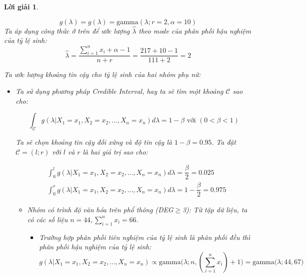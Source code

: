 \documentclass[14pt, a4paper]{article}
\theoremstyle{sltheorem}
\theoremstyle{soltheorem}
\newtheorem*{loigiai}{Lời giải}
\begin{document}
\begin{loigiai}
\begin{enumerate}
\begin{itemize}
\begin{itemize}
\begin{equation*}
                    g(\lambda) = g(\lambda) = \text{gamma}(\lambda; r=2, \alpha=10)
                \end{equation*}
                Ta áp dụng công thức ở trên để ước lượng $\hat{\lambda}$ theo mode của phân phối hậu nghiệm của tỷ lệ sinh:
                \begin{equation*}
                    \hat{\lambda} = \dfrac{\sum_{i=1}^n x_i + \alpha - 1}{n + r} = \dfrac{217+10-1}{111 + 2}=2
                \end{equation*}
            \end{itemize}
        \end{itemize}

        Ta ước lượng khoảng tin cậy cho tỷ lệ sinh của hai nhóm phụ nữ:

        \begin{itemize}
            \item Ta sử dụng phương pháp Credible Interval, hay ta sẽ tìm một khoảng $\mathcal{C}$ sao cho:

        \begin{equation*}
            \int_{\mathcal{C}} g(\lambda \vert X_1 =x_1, X_2=x_2, \dots, X_n=x_n) d\lambda = 1 - \beta \text{ với } (0 < \beta < 1)
        \end{equation*}

        Ta sẽ chọn khoảng tin cậy đối xứng và độ tin cậy là $1-\beta=0.95$.
        Ta đặt $\mathcal{C}=(l;r)$ với $l$ và $r$ là hai giá trị sao cho:

        \begin{equation*}
            \begin{aligned}
                &\int_{0}^l g(\lambda \vert X_1 =x_1, X_2=x_2, \dots, X_n=x_n) d\lambda = \dfrac{\beta}{2}=0.025 \\
                &\int_{0}^r g(\lambda \vert X_1 =x_1, X_2=x_2, \dots, X_n=x_n) d\lambda = 1-\dfrac{\beta}{2}=0.975
            \end{aligned}
        \end{equation*}

        \begin{itemize}
            \item Nhóm có trình độ văn hóa trên phổ thông (DEG$\geq$3):
            Từ tập dữ liệu, ta có các số liệu $n=44, \sum_{i=1}^n x_i=66$.
            \begin{itemize}
                \item Trường hợp phân phối tiên nghiệm của tỷ lệ sinh là phân phối đều thì phân phối hậu nghiệm của tỷ lệ sinh:
                \begin{equation*}
                    g(\lambda \vert X_1 =x_1, X_2=x_2, \dots, X_n=x_n) \propto \text{gamma}\big(\lambda; n, (\sum_{i=1}^n x_i) + 1\big) = \text{gamma}\big(\lambda; 44, 67\big)
                \end{equation*}


\end{itemize}
\end{itemize}
\end{itemize}
\end{enumerate}
\end{loigiai}
\end{document}
